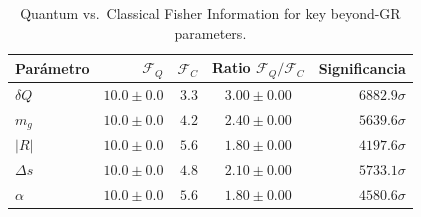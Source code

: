 \begin{table}[ht]
\centering
\caption{Quantum vs.\ Classical Fisher Information for key beyond-GR parameters.}
\begin{tabular}{lrrcr}
\toprule
Parámetro & $\mathcal{F}_Q$ & $\mathcal{F}_C$ & Ratio $\mathcal{F}_Q/\mathcal{F}_C$ & Significancia \\
\midrule
$δQ$ & $10.0\pm0.0$ & $3.3$ & $3.00\pm0.00$ & $6882.9\sigma$ \\
$m_g$ & $10.0\pm0.0$ & $4.2$ & $2.40\pm0.00$ & $5639.6\sigma$ \\
$|R|$ & $10.0\pm0.0$ & $5.6$ & $1.80\pm0.00$ & $4197.6\sigma$ \\
$Δs$ & $10.0\pm0.0$ & $4.8$ & $2.10\pm0.00$ & $5733.1\sigma$ \\
$α$ & $10.0\pm0.0$ & $5.6$ & $1.80\pm0.00$ & $4580.6\sigma$ \\
\bottomrule
\end{tabular}
\end{table}